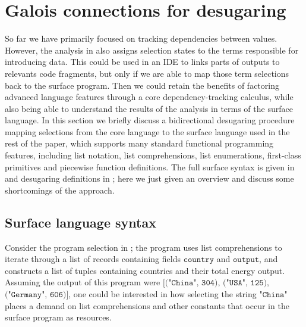 \newpage
\section{Galois connections for desugaring}
\label{sec:surface-language}

So far we have primarily focused on tracking dependencies between values. However, the analysis in  also assigns selection states to the terms responsible for introducing data. This could be used in an IDE to links parts of outputs to relevants code fragments, but only if we are able to map those term selections back to the surface program. Then we could retain the benefits of factoring advanced language features through a core dependency-tracking calculus, while also being able to understand the results of the analysis in terms of the surface language. In this section we briefly discuss a bidirectional desugaring procedure mapping selections from the core language to the surface language \OurLanguage{} used in the rest of the paper, which supports many standard functional programming features, including list notation, list comprehensions, list enumerations, first-class primitives and piecewise function definitions. The full surface syntax is given in  and desugaring definitions in ; here we just given an overview and discuss some shortcomings of the approach.




\subsection{Surface language syntax}

Consider the program selection in ; the program uses list comprehensions to iterate through a list of records containing fields $\texttt{country}$ and $\texttt{output}$, and constructs a list of tuples containing countries and their total energy output. Assuming the output of this program were $\texttt{[("China", 304), ("USA", 125),}$ $\texttt{("Germany", 606)]}$, one could be interested in how selecting the string $\texttt{"China"}$ places a demand on list comprehensions and other constants that occur in the surface program as resources.

